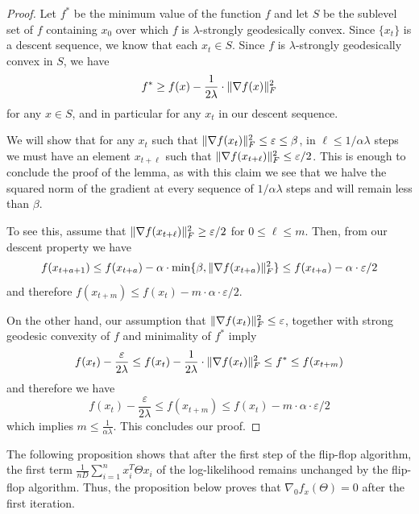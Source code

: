 \documentclass[aos]{imsart}
\theoremstyle{definition}
\numberwithin{equation}{section}
\DeclarePairedDelimiter{\norm}{\lVert}{\rVert}
\newcommand{\samp}{x}
\begin{document}
\begin{proof}
	Let $f^*$ be the minimum value of the function $f$ and let $S$ be the sublevel set of $f$ containing $x_0$ over which $f$ is $\lambda$-strongly geodesically convex. Since $\{x_t\}$ is a descent sequence, we know that each $x_t \in S$. Since $f$ is $\lambda$-strongly geodesically convex in $S$, we have
	$$ f^* \geq f(x) - \frac{1}{2\lambda} \cdot \norm{\nabla f(x)}_F^2 $$
	for any $x \in S$, and in particular for any $x_t$ in our descent sequence.

	 We will show that for any $x_t$ such that $\norm{\nabla f(x_t)}_F^2 \leq \varepsilon \leq \beta$, in $\ell \leq 1/\alpha \lambda$ steps we must have an element $x_{t+\ell}$ such that $\norm{\nabla f(x_{t + \ell})}_F^2 \leq \varepsilon/2$. This is enough to conclude the proof of the lemma, as with this claim we see that we halve the squared norm of the gradient at every sequence of $1/\alpha \lambda$ steps and will remain less than $\beta$.

	To see this, assume that $\norm{\nabla f(x_{t+\ell})}_F^2 \geq \varepsilon/2$ for $0 \leq \ell \leq m$.
	Then, from our descent property we have
	$$ f(x_{t+a+1}) \leq f(x_{t+a}) - \alpha \cdot \min\{\beta,  \norm{\nabla f(x_{t+a})}^2_F \} \leq f(x_{t+a}) - \alpha \cdot \varepsilon/2$$
	and therefore $f(x_{t + m}) \leq f(x_t) - m \cdot \alpha \cdot \varepsilon/2$.

	On the other hand, our assumption that $\norm{\nabla f(x_t)}_F^2 \leq \varepsilon$, together with strong geodesic convexity of $f$ and minimality of $f^*$ imply
	$$ f(x_t) - \frac{\varepsilon}{2\lambda} \leq f(x_t) - \frac{1}{2\lambda} \cdot \norm{\nabla f(x_t)}_F^2 \leq f^* \leq f(x_{t+m}) $$
	and therefore we have
	$$ f(x_t) - \frac{\varepsilon}{2\lambda} \leq f(x_{t + m}) \leq f(x_t) - m \cdot \alpha \cdot \varepsilon/2 $$
	which implies $m \leq \frac{1}{\alpha \lambda}$. This concludes our proof.
\end{proof}

The following proposition shows that after the first step of the flip-flop algorithm, the first term $\frac{1}{nD}\sum_{i = 1}^n \samp_i^T \Theta \samp_i$ of the log-likelihood remains unchanged by the flip-flop algorithm.
Thus, the proposition below proves that $\nabla_0 f_x(\Theta) = 0$ after the first iteration. %
\end{document}
